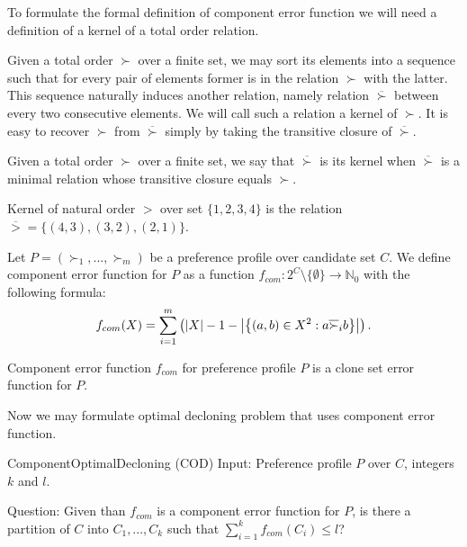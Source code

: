 To formulate the formal definition of component error function
we will need a definition of a kernel of a total order relation.

Given a total order $\succ$ over a finite set, we may sort its elements into a sequence
such that for every pair of elements former is in the relation $\succ$ with the latter.
This sequence naturally induces another relation, namely relation $\overline{\succ}$
between every two consecutive elements.
We will call such a relation a kernel of $\succ$.
It is easy to recover $\succ$ from $\overline{\succ}$
simply by taking the transitive closure of $\overline{\succ}$.

\begin{defn}
Given a total order $\succ$ over a finite set, we say that $\overline{\succ}$ is its kernel when
$\overline{\succ}$ is a minimal relation whose transitive closure equals $\succ$.
\end{defn}

\begin{exmp}
\sloppy
Kernel of natural order $>$ over set $\{1,2,3,4\}$ is the relation
$\overline{>} = \{(4,3), (3,2), (2,1)\}$.
\end{exmp}

\begin{defn}
Let $P = (\succ_1, ..., \succ_m)$ be a preference profile over candidate set $C$.
We define component error function for $P$ as
a function $f_{com}: 2^C \setminus \{\emptyset\} \rightarrow \mathbb{N}_0$ with the following formula:
$$ f_{com}(X) = \sum_{i=1}^m \left( \left\vert X \right\vert-1 -
\left\vert \left\lbrace \left( a,b \right) \in X^2 : a \overline{\succ}_i b \right\rbrace  \right\vert
\right) \text{.}$$
\end{defn}

\begin{rmrk}
Component error function $f_{com}$ for preference profile $P$ is a clone set error function for $P$.
\end{rmrk}

Now we may formulate optimal decloning problem that uses component error function.

\begin{problem}{ComponentOptimalDecloning (COD)}
	Input: Preference profile $P$ over $C$, integers $k$ and $l$.

	Question: Given than $f_{com}$ is a component error function for $P$,
		is there a partition of $C$ into $C_1, ..., C_k$ such that $\sum_{i=1}^k f_{com}(C_i) \leq l$?
\end{problem}

